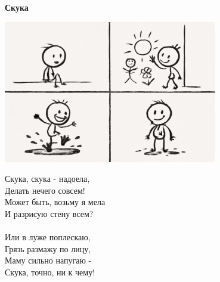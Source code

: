 \vspace*{\fill}
\begin{center}
  {\huge\textbf{Скука}}

  \vspace{1.5em}
  \includegraphics[width=0.7\textwidth]{pictures/skuka.png}
  \vspace{4em}
  \parbox{0.6\textwidth}{
    \LARGE
    \begin{spacing}{1.2}
      Скука, скука - надоела,\\
      Делать нечего совсем!\\
      Может быть, возьму я мела\\
      И разрисую стену всем?\\
      \\
      Или в луже поплескаю,\\
      Грязь размажу по лицу,\\
      Маму сильно напугаю -\\
      Скука, точно, ни к чему! %
    \end{spacing}
      
  }
\end{center}
\vspace*{\fill}